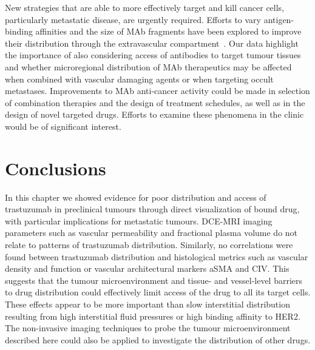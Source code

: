 
New strategies that are able to more effectively target and kill cancer cells, particularly metastatic disease, are urgently required.
Efforts to vary antigen-binding affinities and the size of \acs{MAb} fragments have been explored to improve their distribution through the extravascular compartment~\cite{Jain:2010ie,Chauhan:2011fi}.
Our data highlight the importance of also considering access of antibodies to target tumour tissues and whether microregional distribution of \acs{MAb} therapeutics may be affected when combined with vascular damaging agents or when targeting occult metastases.
Improvements to \acs{MAb} anti-cancer activity could be made in selection of combination therapies and the design of treatment schedules, as well as in the design of novel targeted drugs.
Efforts to examine these phenomena in the clinic would be of significant interest.

\section{Conclusions}
In this chapter we showed evidence for poor distribution and access of trastuzumab in preclinical tumours through direct visualization of bound drug, with particular implications for metastatic tumours.
\acs{DCE-MRI} imaging parameters such as vascular permeability and fractional plasma volume do not relate to patterns of trastuzumab distribution.
\sloppy
Similarly, no correlations were found between trastuzumab distribution and histological metrics such as vascular density and function or vascular architectural markers \acs{aSMA} and \acs{CIV}.
This suggests that the tumour microenvironment and tissue- and vessel-level barriers to drug distribution could effectively limit access of the drug to all its target cells.
These effects appear to be more important than slow interstitial distribution resulting from high interstitial fluid pressures or high binding affinity to \acs{HER2}.
The non-invasive imaging techniques to probe the tumour microenvironment described here could also be applied to investigate the distribution of other drugs.

\endinput